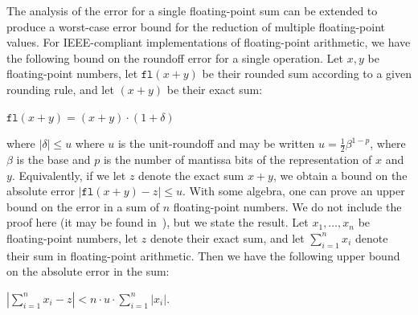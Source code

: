 The analysis of the error for a single floating-point sum can be
extended to produce a worst-case error bound for the reduction of
multiple floating-point values.  For IEEE-compliant implementations of
floating-point arithmetic, we have the following bound on the roundoff
error for a single operation. Let $x, y$ be floating-point numbers,
let $\texttt{fl}(x+y)$ be their rounded sum according to a given
rounding rule, and let $(x+y)$ be their exact sum:
\begin{center}
	$\texttt{fl}(x+y) = (x+y)\cdot (1+\delta)$ 
\end{center}
where $|\delta| \leq u$ where $u$ is the unit-roundoff and may be
written $u = \frac{1}{2}\beta^{1-p}$, where $\beta$ is the base and
$p$ is the number of mantissa bits of the representation of $x$ and
$y$. Equivalently, if we let $z$ denote the exact sum $x+y$, we obtain
a bound on the absolute error $| \texttt{fl}(x+y) - z| \leq u$.  With
some algebra, one can prove an upper bound on the error in a sum of
$n$ floating-point numbers. We do not include the proof here (it may
be found in~\cite{Higham93}), but we state the result. Let $x_1,
\ldots, x_n$ be floating-point numbers, let $z$ denote their exact
sum, and let $\sum\limits_{i=1}^{n}x_i$ denote their sum in
floating-point arithmetic. Then we have the following upper bound on
the absolute error in the sum:
\begin{center}
	$|\sum\limits_{i=1}^{n}x_i - z| < n \cdot u \cdot \sum\limits_{i=1}^{n} |x_i|.$
\end{center}


